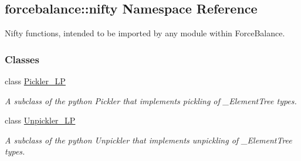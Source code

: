 \hypertarget{namespaceforcebalance_1_1nifty}{\subsection{forcebalance\-:\-:nifty \-Namespace \-Reference}
\label{namespaceforcebalance_1_1nifty}
}


\-Nifty functions, intended to be imported by any module within \-Force\-Balance.  


\subsubsection*{\-Classes}
\begin{DoxyCompactItemize}
\item 
class \hyperlink{classforcebalance_1_1nifty_1_1Pickler__LP}{\-Pickler\-\_\-\-L\-P}
\begin{DoxyCompactList}\small\item\em \-A subclass of the python \-Pickler that implements pickling of \-\_\-\-Element\-Tree types. \end{DoxyCompactList}\item 
class \hyperlink{classforcebalance_1_1nifty_1_1Unpickler__LP}{\-Unpickler\-\_\-\-L\-P}
\begin{DoxyCompactList}\small\item\em \-A subclass of the python \-Unpickler that implements unpickling of \-\_\-\-Element\-Tree types. \end{DoxyCompactList}\end{DoxyCompactItemize}
